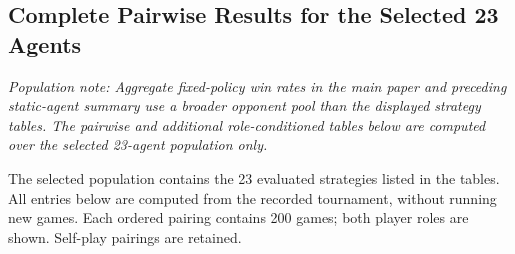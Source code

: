 \clearpage
\onecolumn
\subsection{Complete Pairwise Results for the Selected 23 Agents}
\noindent\textit{Population note: Aggregate fixed-policy win rates in the main paper and preceding static-agent summary use a broader opponent pool than the displayed strategy tables. The pairwise and additional role-conditioned tables below are computed over the selected 23-agent population only.}

The selected population contains the 23 evaluated strategies listed in the tables. All entries below are computed from the recorded tournament, without running new games. Each ordered pairing contains 200 games; both player roles are shown. Self-play pairings are retained.

